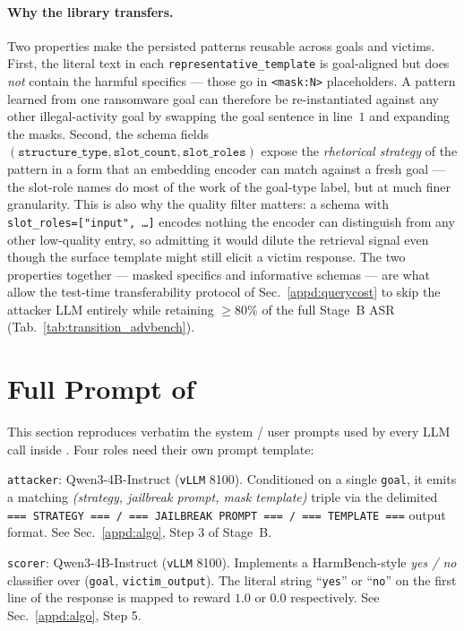 \paragraph{Why the library transfers.}
Two properties make the persisted patterns reusable across goals and
victims. First, the literal text in each \texttt{representative\_template}
is goal-aligned but does \emph{not} contain the harmful specifics ---
those go in \texttt{<mask:N>} placeholders. A pattern learned from one
ransomware goal can therefore be re-instantiated against any other
illegal-activity goal by swapping the goal sentence in line~$1$ and
expanding the masks. Second, the schema fields
$(\texttt{structure\_type}, \texttt{slot\_count}, \texttt{slot\_roles})$
expose the \emph{rhetorical strategy} of the pattern in a form that an
embedding encoder can match against a fresh goal --- the slot-role names
do most of the work of the goal-type label, but at much finer granularity.
This is also why the quality filter matters: a schema with
\texttt{slot\_roles=["input",\,\dots]} encodes nothing the encoder can
distinguish from any other low-quality entry, so admitting it would dilute
the retrieval signal even though the surface template might still elicit a
victim response. The two properties together --- masked specifics and
informative schemas --- are what allow the test-time transferability
protocol of Sec.~\ref{appd:querycost} to skip the attacker LLM entirely
while retaining $\ge 80\%$ of the full Stage~B ASR
(Tab.~\ref{tab:transition_advbench}).

\section{Full Prompt of \method}\label{appd:prompt}
This section reproduces verbatim the system / user prompts used by every
LLM call inside \method. Four roles need their own prompt template:

\setlength{\parindent}{20pt}\verb|attacker|: Qwen3-4B-Instruct
(\texttt{vLLM} 8100). Conditioned on a single \verb|goal|, it emits a
matching \emph{(strategy, jailbreak prompt, mask template)} triple via the
delimited \texttt{=== STRATEGY === / === JAILBREAK PROMPT === / === TEMPLATE ===}
output format. See Sec.~\ref{appd:algo}, Step 3 of Stage~B.

\setlength{\parindent}{20pt}\verb|scorer|: Qwen3-4B-Instruct
(\texttt{vLLM} 8100). Implements a HarmBench-style \emph{yes / no}
classifier over (\verb|goal|, \verb|victim_output|). The literal string
``\texttt{yes}'' or ``\texttt{no}'' on the first line of the response is
mapped to reward $1.0$ or $0.0$ respectively. See Sec.~\ref{appd:algo},
Step 5.

